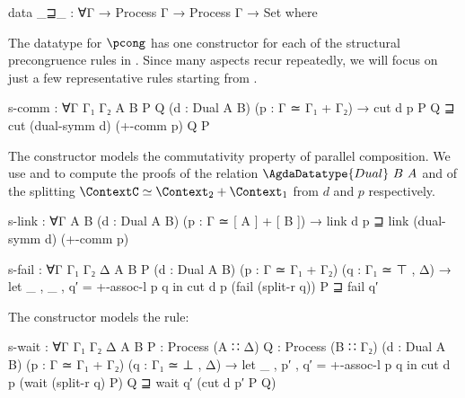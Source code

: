 \begin{AgdaAlign}
\begin{code}
data _⊒_ : ∀{Γ} → Process Γ → Process Γ → Set where
\end{code}

The datatype for $\pcong$ has one constructor for each of the structural
precongruence rules in . Since many aspects recur
repeatedly, we will focus on just a few representative rules starting from
\SComm.

\begin{code}
  s-comm :
    ∀{Γ Γ₁ Γ₂ A B P Q} (d : Dual A B) (p : Γ ≃ Γ₁ + Γ₂) →
    cut d p P Q ⊒ cut (dual-symm d) (+-comm p) Q P
\end{code}

The constructor  models the commutativity
property of parallel composition. We use  and
 to compute the proofs of the relation
$\AgdaDatatype{Dual}~B~A$ and of the splitting $\ContextC \simeq \Context_2 +
\Context_1$ from $d$ and $p$ respectively.

\begin{code}[hide]
  s-link :
    ∀{Γ A B}
    (d : Dual A B) (p : Γ ≃ [ A ] + [ B ]) →
    link d p ⊒ link (dual-symm d) (+-comm p)

  s-fail :
    ∀{Γ Γ₁ Γ₂ Δ A B P} (d : Dual A B)
    (p : Γ ≃ Γ₁ + Γ₂) (q : Γ₁ ≃ ⊤ , Δ) →
    let _ , _ , q′ = +-assoc-l p q in
    cut d p (fail (split-r q)) P ⊒ fail q′
\end{code}

The constructor  models the \SWait rule:

\begin{code}
  s-wait :
    ∀{Γ Γ₁ Γ₂ Δ A B} {P : Process (A ∷ Δ)} {Q : Process (B ∷ Γ₂)}
    (d : Dual A B) (p : Γ ≃ Γ₁ + Γ₂) (q : Γ₁ ≃ ⊥ , Δ) →
    let _ , p′ , q′ = +-assoc-l p q in
    cut d p (wait (split-r q) P) Q ⊒ wait q′ (cut d p′ P Q)
\end{code}


\end{AgdaAlign}
